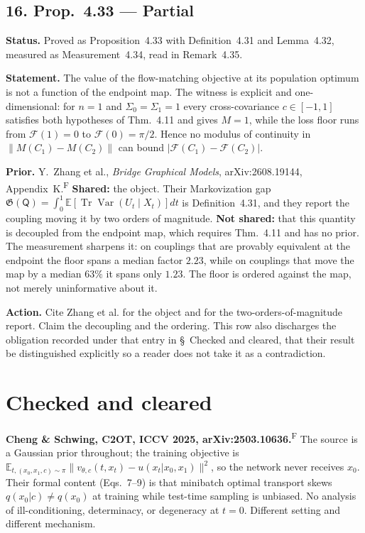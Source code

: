 \documentclass[11pt]{article}
\newcommand{\F}{\textsuperscript{F}}
\begin{document}
\subsection*{16. Prop.~4.33 --- Partial}

\textbf{Status.} Proved as Proposition~4.33 with Definition~4.31 and Lemma~4.32, measured as
Measurement~4.34, read in Remark~4.35.

\textbf{Statement.} The value of the flow-matching objective at its population optimum is not a
function of the endpoint map. The witness is explicit and one-dimensional: for $n=1$ and
$\Sigma_0=\Sigma_1=1$ every cross-covariance $c\in[-1,1]$ satisfies both hypotheses of
Thm.~4.11 and gives $M=1$, while the loss floor runs from $\mathcal F(1)=0$ to
$\mathcal F(0)=\pi/2$. Hence no modulus of continuity in $\|M(C_1)-M(C_2)\|$ can bound
$|\mathcal F(C_1)-\mathcal F(C_2)|$.

\textbf{Prior.} Y.~Zhang et al., \emph{Bridge Graphical Models}, arXiv:2608.19144, Appendix~K.\F{}
\textbf{Shared:} the object. Their Markovization gap
$\mathfrak G(\mathsf Q)=\int_0^1\mathbb E[\operatorname{Tr}\operatorname{Var}(U_t\mid X_t)]dt$
is Definition~4.31, and
they report the coupling moving it by two orders of magnitude. \textbf{Not shared:} that this
quantity is decoupled from the endpoint map, which requires Thm.~4.11 and has no prior. The
measurement sharpens it: on couplings that are provably equivalent at the endpoint the floor
spans a median factor $2.23$, while on couplings that move the map by a median $63\%$ it spans
only $1.23$. The floor is ordered against the map, not merely uninformative about it.

\textbf{Action.} Cite Zhang et al. for the object and for the two-orders-of-magnitude report.
Claim the decoupling and the ordering. This row also discharges the obligation recorded under
that entry in \S~Checked and cleared, that their result be distinguished explicitly so a reader
does not take it as a contradiction.

\section{Checked and cleared}

\textbf{Cheng \& Schwing, C2OT, ICCV 2025, arXiv:2503.10636.}\F{} The source is a Gaussian prior
throughout; the training objective is
$\mathbb E_{t,(x_0,x_1,c)\sim\pi}\|v_{\theta,c}(t,x_t)-u(x_t|x_0,x_1)\|^2$, so the network never
receives $x_0$. Their formal content (Eqs.~7--9) is that minibatch optimal transport skews
$q(x_0|c)\neq q(x_0)$ at training while test-time sampling is unbiased. No analysis of
ill-conditioning, determinacy, or degeneracy at $t=0$. Different setting and different mechanism.
\end{document}
